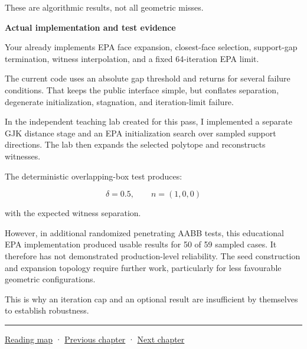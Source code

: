 These are algorithmic results, not all geometric misses.

\textbf{Actual implementation and test evidence}

Your  already implements EPA face expansion, closest-face selection, support-gap termination, witness interpolation, and a fixed 64-iteration EPA limit.

The current code uses an absolute gap threshold and returns  for several failure conditions. That keeps the public interface simple, but conflates separation, degenerate initialization, stagnation, and iteration-limit failure.

In the independent teaching lab created for this pass, I implemented a separate GJK distance stage and an EPA initialization search over sampled support directions. The lab then expands the selected polytope and reconstructs witnesses.

The deterministic overlapping-box test produces:

\[
\boxed{ \delta=0.5,\qquad n=(1,0,0) }
\]

with the expected witness separation.

However, in additional randomized penetrating AABB tests, this educational EPA implementation produced usable results for 50 of 59 sampled cases. It therefore has not demonstrated production-level reliability. The seed construction and expansion topology require further work, particularly for less favourable geometric configurations.

This is why an iteration cap and an optional result are insufficient by themselves to establish robustness.

\begin{center}\rule{0.5\linewidth}{0.5pt}\end{center}

\hyperref[volume-reading-map]{Reading map} · \hyperref[04-visual-computing-ii-ch024-raytriangle-intersection]{Previous chapter} · \hyperref[04-visual-computing-ii-ch026-contact-features-and-manifolds]{Next chapter}
